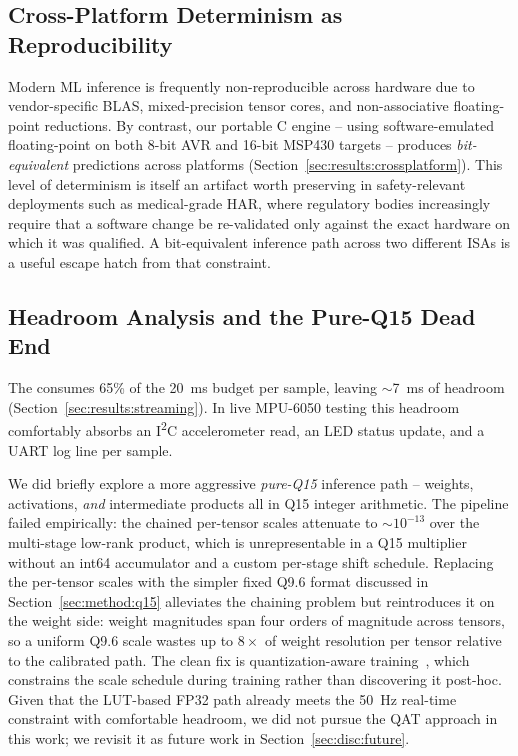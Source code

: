 \subsection{Cross-Platform Determinism as Reproducibility}
\label{sec:disc:determinism}

Modern ML inference is frequently non-reproducible across hardware
due to vendor-specific BLAS, mixed-precision tensor cores, and
non-associative floating-point reductions. By contrast, our
portable C engine -- using software-emulated floating-point on
both 8-bit AVR and 16-bit MSP430 targets -- produces \emph{bit-equivalent}
predictions across platforms (Section~\ref{sec:results:crossplatform}).
This level of determinism is itself an artifact worth preserving
in safety-relevant deployments such as medical-grade HAR, where
regulatory bodies increasingly require that a software change be
re-validated only against the exact hardware on which it was
qualified. A bit-equivalent inference path across two different
ISAs is a useful escape hatch from that constraint.

\subsection{Headroom Analysis and the Pure-Q15 Dead End}
\label{sec:disc:headroom}

The \msp{} consumes 65\% of the 20~ms budget per sample, leaving
$\sim$7~ms of headroom (Section~\ref{sec:results:streaming}). In
live MPU-6050 testing this headroom comfortably absorbs an
I\textsuperscript{2}C accelerometer read, an LED status update,
and a UART log line per sample.

We did briefly explore a more aggressive \emph{pure-Q15} inference
path -- weights, activations, \emph{and} intermediate products all
in Q15 integer arithmetic. The pipeline failed empirically: the
chained per-tensor scales attenuate to $\sim$$10^{-13}$ over the
multi-stage low-rank product, which is unrepresentable in a Q15
multiplier without an int64 accumulator and a custom per-stage
shift schedule. Replacing the per-tensor scales with the simpler
fixed Q9.6 format discussed in Section~\ref{sec:method:q15}
alleviates the chaining problem but reintroduces it on the
weight side: weight magnitudes span four orders of magnitude
across tensors, so a uniform Q9.6 scale wastes up to $8\times$
of weight resolution per tensor relative to the calibrated path.
The clean fix is quantization-aware training~\cite{hubara2017qnn},
which constrains the scale schedule during training rather than
discovering it post-hoc. Given that
the LUT-based FP32 path already meets the 50~Hz real-time
constraint with comfortable headroom, we did not pursue the
QAT approach in this work; we revisit it as future work in
Section~\ref{sec:disc:future}.

